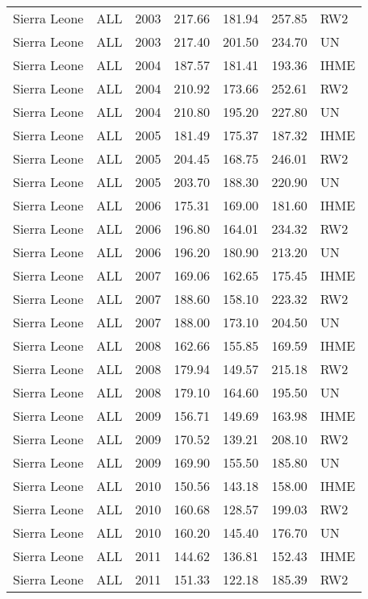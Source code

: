 \begin{longtable}{lllrrrl}
  Sierra Leone & ALL & 2003 & 217.66 & 181.94 & 257.85 & RW2 \\ 
  Sierra Leone & ALL & 2003 & 217.40 & 201.50 & 234.70 & UN \\ 
  Sierra Leone & ALL & 2004 & 187.57 & 181.41 & 193.36 & IHME \\ 
  Sierra Leone & ALL & 2004 & 210.92 & 173.66 & 252.61 & RW2 \\ 
  Sierra Leone & ALL & 2004 & 210.80 & 195.20 & 227.80 & UN \\ 
  Sierra Leone & ALL & 2005 & 181.49 & 175.37 & 187.32 & IHME \\ 
  Sierra Leone & ALL & 2005 & 204.45 & 168.75 & 246.01 & RW2 \\ 
  Sierra Leone & ALL & 2005 & 203.70 & 188.30 & 220.90 & UN \\ 
  Sierra Leone & ALL & 2006 & 175.31 & 169.00 & 181.60 & IHME \\ 
  Sierra Leone & ALL & 2006 & 196.80 & 164.01 & 234.32 & RW2 \\ 
  Sierra Leone & ALL & 2006 & 196.20 & 180.90 & 213.20 & UN \\ 
  Sierra Leone & ALL & 2007 & 169.06 & 162.65 & 175.45 & IHME \\ 
  Sierra Leone & ALL & 2007 & 188.60 & 158.10 & 223.32 & RW2 \\ 
  Sierra Leone & ALL & 2007 & 188.00 & 173.10 & 204.50 & UN \\ 
  Sierra Leone & ALL & 2008 & 162.66 & 155.85 & 169.59 & IHME \\ 
  Sierra Leone & ALL & 2008 & 179.94 & 149.57 & 215.18 & RW2 \\ 
  Sierra Leone & ALL & 2008 & 179.10 & 164.60 & 195.50 & UN \\ 
  Sierra Leone & ALL & 2009 & 156.71 & 149.69 & 163.98 & IHME \\ 
  Sierra Leone & ALL & 2009 & 170.52 & 139.21 & 208.10 & RW2 \\ 
  Sierra Leone & ALL & 2009 & 169.90 & 155.50 & 185.80 & UN \\ 
  Sierra Leone & ALL & 2010 & 150.56 & 143.18 & 158.00 & IHME \\ 
  Sierra Leone & ALL & 2010 & 160.68 & 128.57 & 199.03 & RW2 \\ 
  Sierra Leone & ALL & 2010 & 160.20 & 145.40 & 176.70 & UN \\ 
  Sierra Leone & ALL & 2011 & 144.62 & 136.81 & 152.43 & IHME \\ 
  Sierra Leone & ALL & 2011 & 151.33 & 122.18 & 185.39 & RW2 \\ 

\end{longtable}
